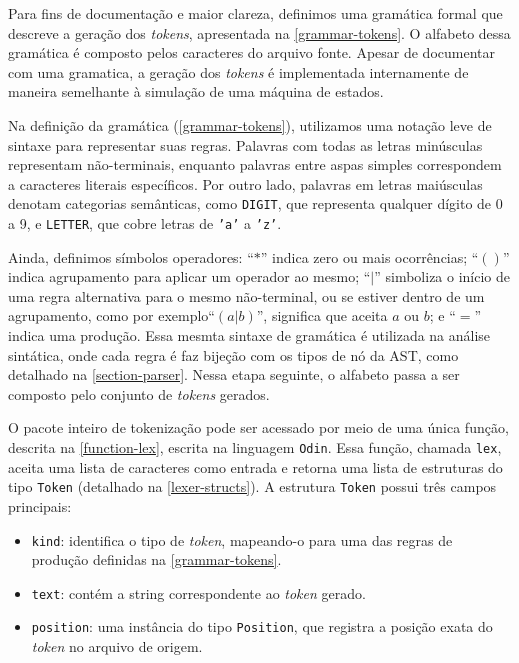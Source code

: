 Para fins de documentação e maior clareza, definimos uma gramática formal que descreve a geração dos \textit{tokens}, apresentada na \autoref{grammar-tokens}. O alfabeto dessa gramática é composto pelos caracteres do arquivo fonte. Apesar de documentar com uma gramatica, a geração dos \textit{tokens} é implementada internamente de maneira semelhante à simulação de uma máquina de estados.

Na definição da gramática (\autoref{grammar-tokens}), utilizamos uma notação leve de sintaxe para representar suas regras. Palavras com todas as letras minúsculas representam não-terminais, enquanto palavras entre aspas simples correspondem a caracteres literais específicos. Por outro lado, palavras em letras maiúsculas denotam categorias semânticas, como \texttt{DIGIT}, que representa qualquer dígito de 0 a 9, e \texttt{LETTER}, que cobre letras de \texttt{'a'} a \texttt{'z'}.

Ainda, definimos símbolos operadores: ``$*$'' indica zero ou mais ocorrências; ``$()$'' indica agrupamento para aplicar um operador ao mesmo; ``$|$'' simboliza o início de uma regra alternativa para o mesmo não-terminal, ou se estiver dentro de um agrupamento, como por exemplo``$(a|b)$'', significa que aceita $a$ ou $b$; e ``$=$'' indica uma produção. Essa mesmta sintaxe de gramática é utilizada na análise sintática, onde cada regra é faz bijeção com os tipos de nó da AST, como detalhado na \autoref{section-parser}. Nessa etapa seguinte, o alfabeto passa a ser composto pelo conjunto de \textit{tokens} gerados.


O pacote inteiro de tokenização pode ser acessado por meio de uma única função, descrita na \autoref{function-lex}, escrita na linguagem \texttt{Odin}. Essa função, chamada \texttt{lex}, aceita uma lista de caracteres como entrada e retorna uma lista de estruturas do tipo \texttt{Token} (detalhado na \autoref{lexer-structs}). A estrutura \texttt{Token} possui três campos principais:

\begin{itemize}
    \item \texttt{kind}: identifica o tipo de \textit{token}, mapeando-o para uma das regras de produção definidas na \autoref{grammar-tokens}.
    \item \texttt{text}: contém a string correspondente ao \textit{token} gerado.
    \item \texttt{position}: uma instância do tipo \texttt{Position}, que registra a posição exata do \textit{token} no arquivo de origem.
\end{itemize}


